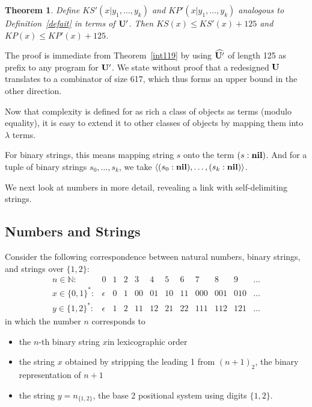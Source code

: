 \documentclass{article}
\newtheorem{theorem}{Theorem}
\newcommand{\tup}[1]{\langle #1 \rangle}
\newcommand{\pref}[2]{(#1:#2)}
\newcommand{\CU}{{\bf U}}
\newcommand{\Cnil}{{\bf nil}}
\begin{document}
\begin{theorem}
Define $KS'(x|y_1,\ldots,y_{k})$ and $KP'(x|y_1,\ldots,y_{k})$
analogous to Definition~\ref{defait} in terms of $\CU'$.
Then $KS(x) \leq KS'(x)+125$ and $KP(x) \leq KP'(x)+125$.
\end{theorem}

The proof is immediate from
Theorem~\ref{int119} by using $\widehat{\CU'}$ of length 125 as
prefix to any program for $\CU'$.
We state without proof that
a redesigned $\CU$ translates to a combinator of size 617,
which thus forms an upper bound in the other direction.

Now that complexity is defined for as rich a class of objects as
terms (modulo equality), it is easy to extend it to other
classes of objects by mapping them into $\lambda$ terms.%

For binary strings, this means mapping string $s$ onto the term
$\pref{s}{\Cnil}$. And for a tuple of binary strings $s_0,\ldots,s_k$,
we take $\tup{\pref{s_0}{\Cnil},\ldots,\pref{s_k}{\Cnil}}$.

We next look at numbers in more detail, revealing a link with
self-delimiting strings.

\subsection{Numbers and Strings}

Consider the following correspondence between
natural numbers, binary strings, and strings over $\{1,2\}$:
\[
\begin{array}{rccccccccccc}
n \in {\mathbb N}:    &        0 & 1 & 2 &  3 &  4 &  5 &  6 &   7 &   8 &   9 & \ldots \\
x \in \{0,1\}^{\ast}: & \epsilon & 0 & 1 & 00 & 01 & 10 & 11 & 000 & 001 & 010 & \ldots \\
y \in \{1,2\}^{\ast}: & \epsilon & 1 & 2 & 11 & 12 & 21 & 22 & 111 & 112 & 121 & \ldots
\end{array}
\]
in which the number $n$ corresponds to
\begin{itemize}
\item the $n$-th binary string $x$in lexicographic order
\item the string $x$ obtained by stripping the leading 1 from $(n+1)_2$,
the binary representation of $n+1$
\item the string $y=n_{\{1,2\}}$, the base 2 positional system using digits $\{1,2\}$.
\end{itemize}
\end{document}
